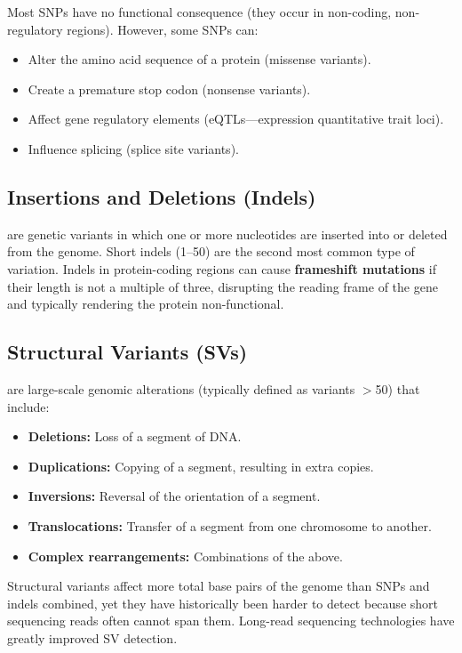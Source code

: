 Most SNPs have no functional consequence (they occur in non-coding, non-regulatory regions). However, some SNPs can:
\begin{itemize}[itemsep=2pt]
  \item Alter the amino acid sequence of a protein (missense variants).
  \item Create a premature stop codon (nonsense variants).
  \item Affect gene regulatory elements (eQTLs---expression quantitative trait loci).
  \item Influence splicing (splice site variants).
\end{itemize}

\subsection{Insertions and Deletions (Indels)}
\label{subsec:molbio:indels}

\textbf{} are genetic variants in which one or more nucleotides are inserted into or deleted from the genome. Short indels (1--50\basepair{}) are the second most common type of variation. Indels in protein-coding regions can cause \textbf{frameshift mutations} if their length is not a multiple of three, disrupting the reading frame of the gene and typically rendering the protein non-functional.

\subsection{Structural Variants (SVs)}
\label{subsec:molbio:svs}

\textbf{} are large-scale genomic alterations (typically defined as variants $>$50\basepair{}) that include:

\begin{itemize}[itemsep=2pt]
  \item \textbf{Deletions:} Loss of a segment of DNA.
  \item \textbf{Duplications:} Copying of a segment, resulting in extra copies.
  \item \textbf{Inversions:} Reversal of the orientation of a segment.
  \item \textbf{Translocations:} Transfer of a segment from one chromosome to another.
  \item \textbf{Complex rearrangements:} Combinations of the above.
\end{itemize}

Structural variants affect more total base pairs of the genome than SNPs and indels combined, yet they have historically been harder to detect because short sequencing reads often cannot span them. Long-read sequencing technologies have greatly improved SV detection.

